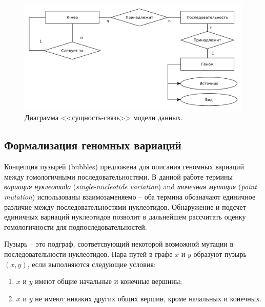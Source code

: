 \begin{figure}[htbp]
	\centering
	\includegraphics[width=\textwidth]{img/er.pdf}
	\caption{Диаграмма <<сущность-связь>> модели данных.}
	\label{fig:er}
\end{figure}

\subsection{Формализация геномных вариаций}
Концепция пузырей (bubbles) предложена\cite{18_minkin2020applications,19_dabbaghie2021bubblegun} для описания геномных вариаций между гомологичными последовательностями. В данной работе термины \textit{вариация нуклеотида} (\textit{single-nucleotide variation}) and \textit{точечная мутация} (\textit{point mutation}) использованы взаимозаменяемо -- оба термина обозначают единичное различие между последовательностями нуклеотидов. Обнаружение и подсчет единичных вариаций нуклеотидов позволит в дальнейшем рассчитать оценку гомологичности для подпоследовательностей. 

Пузырь -- это подграф, соответсвующий некоторой возможной мутации\cite{18_minkin2020applications} в последовательности нуклеотидов. Пара путей в графе $ x $ и $ y $ образуют пузырь $ \left(x,y\right) $, если выполняются следующие условия:
\begin{enumerate} 
	\item $ x $ и $ y $ имеют общие начальные и конечные вершины;
	\item $ x $ и $ y $ не имеют никаких других общих вершин, кроме начальных и конечных.
\end{enumerate}

